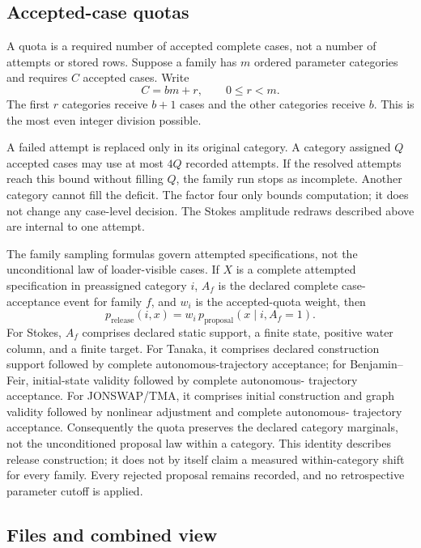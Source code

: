 \documentclass[10pt]{article}
\begin{document}
\subsection{Accepted-case quotas}

A quota is a required number of accepted complete cases, not a number of
attempts or stored rows.  Suppose a family has $m$ ordered parameter
categories and requires $C$ accepted cases.  Write
\[
  C=bm+r,\qquad 0\leq r<m.
\]
The first $r$ categories receive $b+1$ cases and the other categories receive $b$.
This is the most even integer division possible.

A failed attempt is replaced only in its original category.  A category assigned
$Q$ accepted cases may use at most $4Q$ recorded attempts.  If the
resolved attempts reach this bound without filling $Q$, the family run stops
as incomplete.  Another category cannot fill the deficit.  The factor four
only bounds computation; it does not change any case-level decision.  The
Stokes amplitude redraws described above are internal to one attempt.

The family sampling formulas govern attempted specifications, not the
unconditional law of loader-visible cases.  If \(X\) is a complete attempted
specification in preassigned category \(i\), \(A_f\) is the declared complete
case-acceptance event for family \(f\), and \(w_i\) is the accepted-quota
weight, then
\[
  p_{\mathrm{release}}(i,x)
  =w_i\,p_{\mathrm{proposal}}(x\mid i,A_f=1).
\]
For Stokes, \(A_f\) comprises declared static support, a finite state, positive
water column, and a finite target.  For Tanaka, it comprises declared
construction support followed by complete autonomous-trajectory acceptance;
for Benjamin--Feir, initial-state validity followed by complete autonomous-
trajectory acceptance.  For JONSWAP/TMA, it comprises initial construction and
graph validity followed by nonlinear adjustment and complete autonomous-
trajectory acceptance.  Consequently the quota preserves the declared
category marginals, not the unconditioned proposal law within a category.
This identity describes release construction; it does not by itself claim a
measured within-category shift for every family.  Every rejected proposal
remains recorded, and no retrospective parameter cutoff is applied.

\subsection{Files and combined view}
\end{document}
